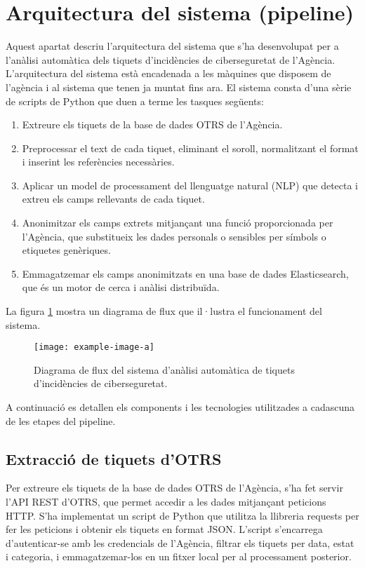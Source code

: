 \section{Arquitectura del sistema (pipeline)}
Aquest apartat descriu l'arquitectura del sistema que s'ha desenvolupat per a l'anàlisi automàtica dels tiquets d'incidències de ciberseguretat de l'Agència. L'arquitectura del sistema està encadenada a les màquines que disposem de l'agència i al sistema que tenen ja muntat fins ara. El sistema consta d'una sèrie de scripts de Python que duen a terme les tasques següents:

\begin{enumerate}
     \item Extreure els tiquets de la base de dades OTRS de l'Agència.
     \item Preprocessar el text de cada tiquet, eliminant el soroll, normalitzant el format i inserint les referències necessàries.
     \item Aplicar un model de processament del llenguatge natural (NLP) que detecta i extreu els camps rellevants de cada tiquet.
     \item Anonimitzar els camps extrets mitjançant una funció proporcionada per l'Agència, que substitueix les dades personals o sensibles per símbols o etiquetes genèriques.
     \item Emmagatzemar els camps anonimitzats en una base de dades Elasticsearch, que és un motor de cerca i anàlisi distribuïda.
\end{enumerate}

La figura \ref{fig:pipeline} mostra un diagrama de flux que il·lustra el funcionament del sistema.

\begin{figure}[H]
     \centering
     \texttt{[image: example-image-a]}
     \caption{Diagrama de flux del sistema d'anàlisi automàtica de tiquets d'incidències de ciberseguretat.}
     \label{fig:pipeline}
\end{figure}

A continuació es detallen els components i les tecnologies utilitzades a cadascuna de les etapes del pipeline.
\subsection{Extracció de tiquets d'OTRS}
Per extreure els tiquets de la base de dades OTRS de l'Agència, s'ha fet servir l'API REST d'OTRS, que permet accedir a les dades mitjançant peticions HTTP. S'ha implementat un script de Python que utilitza la llibreria requests per fer les peticions i obtenir els tiquets en format JSON. L'script s'encarrega d'autenticar-se amb les credencials de l'Agència, filtrar els tiquets per data, estat i categoria, i emmagatzemar-los en un fitxer local per al processament posterior.

